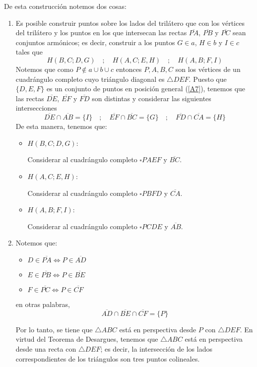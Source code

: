 \documentclass[12pt]{book}
\theoremstyle{definition}
\begin{document}
De esta construcción notemos dos cosas:
\begin{enumerate}
\item\label{polaridad1} Es posible construir puntos sobre los lados del trilátero que con los vértices del trilátero y los puntos en los que intersecan las rectas $\overline{PA}$, $\overline{PB}$ y $\overline{PC}$ sean conjuntos armónicos; es decir, construir a los puntos $G \in a$, $H \in b$ y $I \in c$ tales que
$$H(B,C;D,G) \quad ; \quad H(A,C;E,H) \quad ; \quad H(A,B;F,I)$$
Notemos que como $P\notin  a \cup b \cup c$ entonces $P, A, B, C$ son los vértices de un cuadrángulo completo cuyo triángulo diagonal es $\triangle DEF$. Puesto que $\{D,E,F\}$ es un conjunto de puntos en posición general (\ref{A7}), tenemos que las rectas $\overline{DE}$, $\overline{EF}$ y $\overline{FD}$ son distintas y considerar las siguientes intersecciones
$$\overline{DE} \cap \overline{AB} = \{I\} \quad ; \quad \overline{EF} \cap \overline{BC} = \{G\} \quad ; \quad \overline{FD} \cap \overline{CA} = \{H\}$$
De esta manera, tenemos que:
\begin{itemize}
\item $H(B,C;D,G)$:

Considerar al cuadrángulo completo $\square PAEF$ y $\overline{BC}$.

\item $H(A,C;E,H)$:

Considerar al cuadrángulo completo $\square PBFD$ y $\overline{CA}$.

\item $H(A,B;F,I)$:

Considerar al cuadrángulo completo $\square PCDE$ y $\overline{AB}$.
\end{itemize}

\item\label{polaridad2} Notemos que:
\begin{itemize}
\item $D \in \overline{PA} \Leftrightarrow P \in \overline{AD}$
\item $E \in \overline{PB} \Leftrightarrow P \in \overline{BE}$
\item $F \in \overline{PC} \Leftrightarrow P \in \overline{CF}$
\end{itemize}
en otras palabras,
$$\overline{AD} \cap \overline{BE} \cap \overline{CF} = \{P\}$$

Por lo tanto, se tiene que $\triangle ABC$ está en perspectiva desde $P$ con $\triangle DEF$. En virtud del Teorema de Desargues, tenemos que $\triangle ABC$ está en perspectiva desde una recta con $\triangle DEF$; es decir, la intersección de los lados correspondientes de los triángulos son tres puntos colineales.
\end{enumerate}
\end{document}
